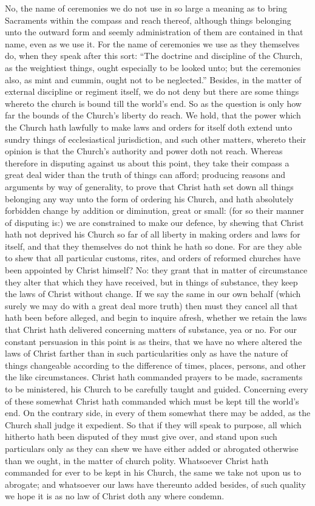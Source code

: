 No, the name of ceremonies we do not use in so large a meaning as to bring Sacraments within the compass and reach thereof, although things belonging unto the outward form and seemly administration of them are contained in that name, even as we use it. For the name of ceremonies we use as they themselves do, when they speak after this sort: “The doctrine and discipline of the Church, as the weightiest things, ought especially to be looked unto; but the ceremonies also, as mint and cummin, ought not to be neglected.” Besides, in the matter of external discipline or regiment itself, we do not deny but there are some things whereto the church is bound till the world’s end. So as the question is only how far the bounds of the Church’s liberty do reach. We hold, that the power which the Church hath lawfully to make laws and orders for itself doth extend unto sundry things of ecclesiastical jurisdiction, and such other matters, whereto their opinion is that the Church’s authority and power doth not reach. Whereas therefore in disputing against us about this point, they take their compass a great deal wider than the truth of things can afford; producing reasons and arguments by way of generality, to prove that Christ hath set down all things belonging any way unto the form of ordering his Church, and hath absolutely forbidden change by addition or diminution, great or small: (for so their manner of disputing is:) we are constrained to make our defence, by shewing that Christ hath not deprived his Church so far of all liberty in making orders and laws for itself, and that they themselves do not think he hath so done. For are they able to shew that all particular customs, rites, and orders of reformed churches have been appointed by Christ himself? No: they grant that in matter of circumstance they alter that which they have received, but in things of substance, they keep the laws of Christ without change. If we say the same in our own behalf (which surely we may do with a great deal more truth) then must they cancel all that hath been before alleged, and begin to inquire afresh, whether we retain the  laws that Christ hath delivered concerning matters of substance, yea or no. For our constant persuasion in this point is as theirs, that we have no where altered the laws of Christ farther than in such particularities only as have the nature of things changeable according to the difference of times, places, persons, and other the like circumstances. Christ hath commanded prayers to be made, sacraments to be ministered, his Church to be carefully taught and guided. Concerning every of these somewhat Christ hath commanded which must be kept till the world’s end. On the contrary side, in every of them somewhat there may be added, as the Church shall judge it expedient. So that if they will speak to purpose, all which hitherto hath been disputed of they must give over, and stand upon such particulars only as they can shew we have either added or abrogated otherwise than we ought, in the matter of church polity. Whatsoever Christ hath commanded for ever to be kept in his Church, the same we take not upon us to abrogate; and whatsoever our laws have thereunto added besides, of such quality we hope it is as no law of Christ doth any where condemn.

